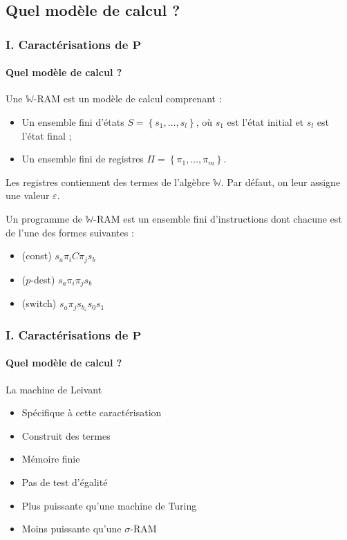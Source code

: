 \documentclass[10pt]{beamer}
\newcommand{\bbW}{\mathbb{W}}
\begin{document}
	
	\subsection{Quel modèle de calcul ?}
	
	\begin{frame}
		\frametitle{I. Caractérisations de $\textbf{P}$}
		\framesubtitle{Quel modèle de calcul ?}
		
		\begin{defn}
			
			Une $\bbW$-RAM est un modèle de calcul comprenant :
			\begin{itemize}[itemsep=-1mm]
				\item 	Un ensemble fini d'états $S = \left\lbrace s_1, \dots, s_l \right\rbrace$, où $s_1$ est l'état initial et $s_l$ est l'état final ;
				\item 	Un ensemble fini de registres $\Pi = \left\lbrace \pi_1, \dots, \pi_m \right\rbrace$.
			\end{itemize}
			
			Les registres contiennent des termes de l'algèbre $\bbW$. Par défaut, on leur assigne une valeur $\varepsilon$.
			
			Un programme de $\bbW$-RAM est un ensemble fini d'instructions dont chacune est de l'une des formes suivantes :
			
			\begin{itemize}[itemsep=-1mm]
				\item 	(const)			$s_a \pi_{i} C \pi_j s_b$
				\item	($p$-dest)		$s_a \pi_i \pi_j s_b$
				\item	(switch)		$s_a \pi_j s_{b_{\varepsilon}} s_{0} s_{1}$
			\end{itemize}
		\end{defn}
	\end{frame}
	
	
	\begin{frame}
		\frametitle{I. Caractérisations de $\textbf{P}$}
		\framesubtitle{Quel modèle de calcul ?}
		
		\begin{block}{La machine de Leivant}
			\begin{itemize}
				\item 	Spécifique à cette caractérisation
				\item 	Construit des termes
				\item 	Mémoire finie
				\item 	Pas de test d'égalité
				\item 	Plus puissante qu'une machine de Turing
				\item 	Moins puissante qu'une $\sigma$-RAM %
			\end{itemize}
		\end{block}
	\end{frame}
	
\end{document}
